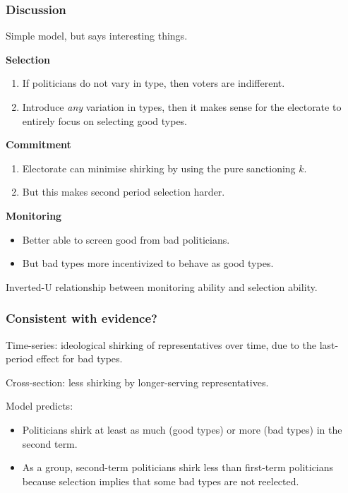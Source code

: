 \documentclass[10pt]{beamer}
\begin{document}
\begin{frame}

\frametitle{Discussion}

Simple model, but says interesting things.

\bigskip

\textbf{Selection}
\begin{enumerate}
\item If politicians do not vary in type, then voters are indifferent.
\item Introduce \textit{any} variation in types, then it makes sense for the electorate to entirely focus on selecting good types.
\end{enumerate}

\textbf{Commitment}
\begin{enumerate}
\item Electorate can minimise shirking by using the pure sanctioning $k$.
\item But this makes second period selection harder.
\end{enumerate}


\textbf{Monitoring}
\begin{itemize}
\item Better able to screen good from bad politicians.
\item But bad types more incentivized to behave as good types.
\end{itemize}

\bigskip

Inverted-U relationship between monitoring ability and selection ability.

\end{frame}

\begin{frame}\frametitle{Consistent with evidence?}

Time-series: ideological shirking of representatives over time, due to the last-period effect for bad types. 

\bigskip

Cross-section: less shirking by longer-serving representatives. 

\bigskip

Model predicts:
\begin{itemize}
\item Politicians shirk at least as much (good types) or more (bad types) in the second term.
\item As a group, second-term politicians shirk less than first-term politicians because selection implies that some bad types are not reelected.
\end{itemize}


\end{frame}
\end{document}
